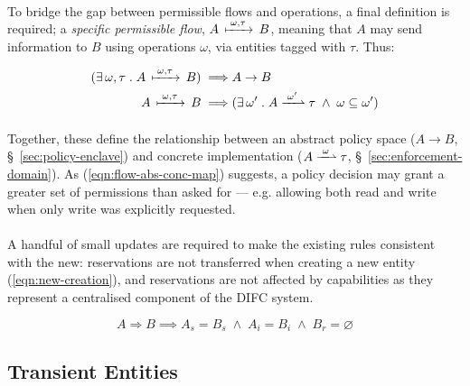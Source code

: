 \paragraph{} To bridge the gap between permissible flows and operations, a final definition is required; a \textit{specific permissible flow}, $A \,\xmapsto{\;\omega,\tau\;}\, B$, meaning that $A$ may send information to $B$ using operations $\omega$, via entities tagged with $\tau$. Thus:

\vspace{-7mm}
\begin{align}
    (\exists\, \omega,\tau \;.\; A \,\xmapsto{\;\omega,\tau\;}\, B) \implies & A \rightarrow B \\
    A \,\xmapsto{\;\omega,\tau\;}\, B \implies & (\exists \,\omega' \;.\; A \xrightharpoonup{\;\omega'\;} \tau \;\land\; \omega \subseteq \omega') \label{eqn:flow-abs-conc-map}
\end{align}

\paragraph{} Together, these define the relationship between an abstract policy space ($A \rightarrow B$, §~\ref{sec:policy-enclave}) and concrete implementation ($A \xrightharpoonup{\;\omega\;} \tau$, §~\ref{sec:enforcement-domain}). As (\ref{eqn:flow-abs-conc-map}) suggests, a policy decision may grant a greater set of permissions than asked for --- e.g. allowing both read and write when only write was explicitly requested.~\cite{flume,Zeldovich2008}

\paragraph{} A handful of small updates are required to make the existing rules consistent with the new: reservations are not transferred when creating a new entity (\ref{eqn:new-creation}), and reservations are not affected by capabilities as they represent a centralised component of the DIFC system. 

\vspace{-5mm}
\begin{equation}
    A \Rightarrow B \implies A_s = B_s \; \wedge \; A_i = B_i \; \wedge \; B_r = \varnothing \label{eqn:new-creation}
\end{equation}


\subsection{Transient Entities}
\label{sec:transient-entities}

